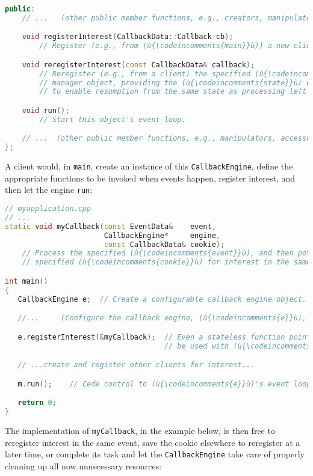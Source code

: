 \begin{lstlisting}[language=C++]
public:
    // ...   (other public member functions, e.g., creators, manipulators)

    void registerInterest(CallbackData::Callback cb);
        // Register (e.g., from (ù{\codeincomments{main}}ù)) a new client with this manager object.

    void reregisterInterest(const CallbackData& callback);
        // Reregister (e.g., from a client) the specified (ù{\codeincomments{callback}}ù) with this
        // manager object, providing the (ù{\codeincomments{state}}ù) contained in the (ù{\codeincomments{CallbackData}}ù)
        // to enable resumption from the same state as processing left off.

    void run();
        // Start this object's event loop.

    // ...  (other public member functions, e.g., manipulators, accessors)
};
\end{lstlisting}

\noindent A client would, in \lstinline!main!, create an instance of this
\lstinline!CallbackEngine!, define the appropriate functions to be invoked
when events happen, register interest, and then let the engine
\lstinline!run!:

\begin{lstlisting}[language=C++]
// myapplication.cpp
// ...
static void myCallback(const EventData&    event,
                       CallbackEngine*     engine,
                       const CallbackData& cookie);
    // Process the specified (ù{\codeincomments{event}}ù), and then potentially reregister the
    // specified (ù{\codeincomments{cookie}}ù) for interest in the same data.

int main()
{
   CallbackEngine e;  // Create a configurable callback engine object.

   //...     (Configure the callback engine, (ù{\codeincomments{e}}ù), as appropriate.)

   e.registerInterest(&myCallback);  // Even a stateless function pointer can
                                     // be used with (ù{\codeincomments{std::function}}ù).

   // ...create and register other clients for interest...

   m.run();    // Cede control to (ù{\codeincomments{e}}ù)'s event loop until complete.

   return 0;
}
\end{lstlisting}

\noindent The implementation of \lstinline!myCallback!, in the example below, is then
free to reregister interest in the same event, save the cookie elsewhere
to reregister at a later time, or complete its task and let the
\lstinline!CallbackEngine! take care of properly cleaning up all now
unnecessary resources:

